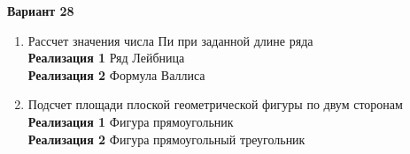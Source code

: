 \textbf{Вариант 28} 
\begin{enumerate}
    \item Рассчет значения числа Пи при заданной длине ряда\\
\textbf{Реализация 1} Ряд Лейбница\\
\textbf{Реализация 2} Формула Валлиса
\item Подсчет площади плоской геометрической фигуры по двум сторонам\\
\textbf{Реализация 1} Фигура прямоугольник\\
\textbf{Реализация 2} Фигура прямоугольный треугольник
\end{enumerate}

\pagebreak

